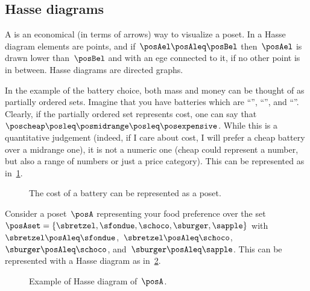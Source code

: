 \subsection{Hasse diagrams}

A \emph{} is an economical (in terms of arrows) way to visualize a poset.
In a Hasse diagram elements are points, and if~$\posAel \posAleq \posBel$ then~$\posAel$ is drawn lower than~$\posBel$ and with an ege connected to it, if no other point is in between.
Hasse diagrams are directed graphs.


In the example of the battery choice, both mass and money can be thought of as partially ordered sets.
Imagine that you have batteries which are ``\poscheap'', ``\posmidrange'', and ``\posexpensive''.
Clearly, if the partially ordered set represents cost, one can say that~$\poscheap \posleq\posmidrange \posleq\posexpensive$.
While this is a quantitative judgement (indeed, if I care about cost, I will prefer a cheap battery over a midrange one), it is not a numeric one (cheap could represent a number, but also a range of numbers or just a price category).
This can be represented as in~\cref{fig:hassebattery}.

\begin{figure}[h!]
	\centering
	\caption{The cost of a battery can be represented as a poset.}
	\label{fig:hassebattery}
\end{figure}

\begin{example}
	Consider a poset~$\posA$ representing your food preference over the set~$\posAset=\{\sbretzel,\sfondue,\schoco,\sburger,\sapple\}$ with~$\sbretzel\posAleq \sfondue$,~$\sbretzel\posAleq \schoco$,~$\sburger\posAleq \schoco$, and~$\sburger\posAleq \sapple$.
	This can be represented with a Hasse diagram as in~\cref{fig:hasse}.
\end{example}

\begin{figure}[h!]
	\centering
	\caption{Example of Hasse diagram of~$\posA$.}
	\label{fig:hasse}
\end{figure}

\begin{marginfigure}
	\centering
	\caption{}
	\label{fig:boolean}
\end{marginfigure}

